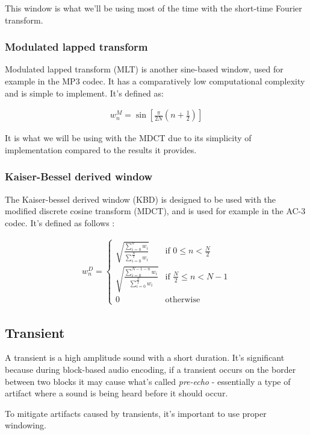 This window is what we'll be using most of the time with the short-time Fourier transform.

\subsubsection{Modulated lapped transform}
\label{sec:mlt}
Modulated lapped transform (MLT) is another sine-based window, used for example in the MP3 codec. It has a comparatively low computational complexity and is simple to implement. \cite{malvar_1990} It's defined as:

\begin{align}
w_n^M = \sin \left[ \frac{\pi}{2N} \left( n + \frac12 \right) \right]
\end{align}

It is what we will be using with the MDCT due to its simplicity of implementation compared to the results it provides.

\subsubsection{Kaiser-Bessel derived window}
The Kaiser-bessel derived window (KBD) is designed to be used with the modified discrete cosine transform (MDCT), and is used for example in the AC-3 codec. It's defined as follows \cite{bosi_goldberg_2003}:

\begin{align}
w_n^D = \begin{cases}
\sqrt{\frac{\sum_{i=0}^{n}w_i}{\sum_{i=0}^{\frac{N}{2}}w_i}} & \text{if $0 \le n < \frac{N}{2}$} \\
\sqrt{\frac{\sum_{i=0}^{N-1-n}w_i}{\sum_{i=0}^{\frac{N}{2}}w_i}} & \text{if $\frac{N}{2} \le n < N - 1$} \\
0 & \text{otherwise}
\end{cases}
\end{align}

\subsection{Transient}
A transient is a high amplitude sound with a short duration. It's significant because during block-based audio encoding, if a transient occurs on the border between two blocks it may cause what's called \emph{pre-echo} - essentially a type of artifact where a sound is being heard before it should occur.

To mitigate artifacts caused by transients, it's important to use proper windowing.

